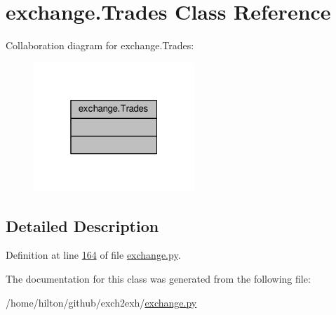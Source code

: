 \hypertarget{classexchange_1_1_trades}{}\section{exchange.\+Trades Class Reference}
\label{classexchange_1_1_trades}


Collaboration diagram for exchange.\+Trades\+:\nopagebreak
\begin{figure}[H]
\begin{center}
\leavevmode
\includegraphics[width=172pt]{classexchange_1_1_trades__coll__graph}
\end{center}
\end{figure}


\subsection{Detailed Description}


Definition at line \hyperlink{exchange_8py_source_l00164}{164} of file \hyperlink{exchange_8py_source}{exchange.\+py}.



The documentation for this class was generated from the following file\+:\begin{DoxyCompactItemize}
\item 
/home/hilton/github/exch2exh/\hyperlink{exchange_8py}{exchange.\+py}\end{DoxyCompactItemize}
